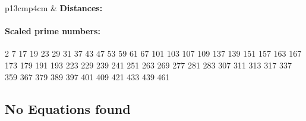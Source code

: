 \documentclass[a4paper,twoside,10pt]{report}
\begin{document}
\begin{longtable}{p{13cm}p{4cm}}
& \textbf{Distances:}\newline
{}\end{longtable}
\paragraph*{Scaled prime numbers:}2 7 17 19 23 29 31 37 43 47 53 59 61 67 101 103 107 109 137 139 151 157 163 167 173 179 191 193 223 229 239 241 251 263 269 277 281 283 307 311 313 317 337 359 367 379 389 397 401 409 421 433 439 461 \subsection*{No Equations found}
\end{document}
